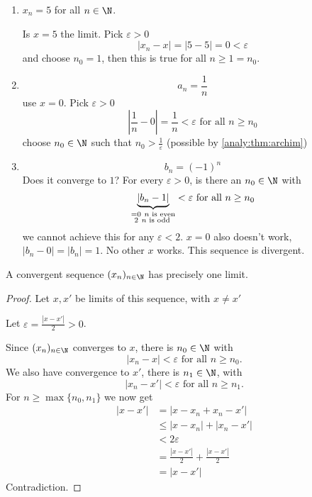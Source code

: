 \documentclass[10pt, a4paper]{article}
\newcommand{\seq}[1][x]{(#1_n)_{n \in \N}}
\begin{document}
\begin{example}
    \begin{enumerate}[label = (\alph*)]
    \item
    $x_n = 5$ for all $n \in \N$.

    Is $x = 5$ the limit.
    Pick $\varepsilon > 0$
    \[
    |x_n - x| = |5 - 5| = 0 < \varepsilon
    \]
    and choose $n_0 = 1$,
    then this is true for all $n \geq 1 = n_0$.
    \item 
    \[
    a_n = \frac{1}{n}
    \]
    use $x = 0$.
    Pick $\varepsilon > 0$
    \[
    \left|\frac{1}{n} - 0\right| = \frac{1}{n} < \varepsilon\text{ for all } n \geq n_0
    \]
    choose $n_0 \in \N$ such that $n_0 > \frac{1}{\varepsilon}$ (possible by \autoref{analy:thm:archim})
    \item
    \[
    b_n = (-1) ^ n
    \]
    Does it converge to $1$?
    For every $\varepsilon > 0$,
    is there an $n_0 \in \N$ with
    \[
    \underbrace{|b_n - 1|}_{\begin{subarray}
        \phantom{}= 0\ n \text{ is even} \\
        \ 2\ n \text{ is odd}
    \end{subarray}} < \varepsilon\text{ for all } n \geq n_0
    \]
    we cannot achieve this for any $\varepsilon < 2$.
    $x = 0$ also doesn't work,
    $|b_n - 0| = |b_n| = 1$.
    No other $x$ works.
    This sequence is divergent.
    \end{enumerate}
\end{example}

\begin{theorem}
    A convergent sequence $\seq$ has precisely one limit.
    \begin{proof}
        Let $x, x'$ be limits of this sequence,
        with $x \neq x'$

        Let $\varepsilon = \frac{|x - x'|}{2} > 0$.

        Since $\seq$ converges to $x$,
        there is $n_0 \in \N$ with
        \[
        |x_n - x| < \varepsilon\text{ for all } n \geq n_0.
        \]
        We also have convergence to $x'$,
        there is $n_1 \in \N$, with
        \[
        |x_n - x'| < \varepsilon\text{ for all } n \geq n_1.
        \]
        For $n \geq \max\{n_0, n_1\}$ we now get
        \begin{align*}
            |x - x'| &= |x - x_n + x_n - x'| \\
            &\leq |x - x_n| + |x_n - x'| \\
            &< 2\varepsilon \\
            &= \frac{|x - x'|}{2} + \frac{|x - x'|}{2} \\
            &= |x - x'|
        \end{align*}
        Contradiction.
    \end{proof}
\end{theorem}
\end{document}
